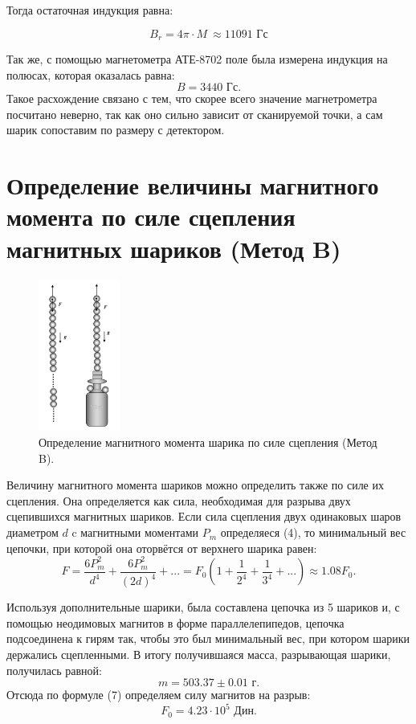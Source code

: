 \documentclass[a4paper, 14pt]{extarticle}%
\newcommand\ECaption[1]{%
     \captionsetup{font=footnotesize}%
     \caption{#1}}
\newcommand\ECaption[1]{%
     \captionsetup{font=footnotesize}%
     \caption{#1}}
\begin{document}
Тогда остаточная индукция равна:

\[B_r = 4\pi\cdot M\ \approx 11091 \text{  Гс} \]

Так же, с помощью магнетометра АТЕ-8702 поле была измерена индукция на полюсах, которая оказалась равна: 
\[B = 3440 \text{ Гс}.\]
Такое расхождение связано с тем, что скорее всего значение магнетрометра посчитано неверно, так как оно сильно зависит от сканируемой точки, а сам шарик сопоставим по размеру с детектором.

\section{Определение величины магнитного момента по силе
сцепления магнитных шариков (Метод B)}

\begin{figure}
\begin{center}
\includegraphics[height=5cm]{teor.png}
\end{center}
\ECaption{Определение магнитного момента шарика по силе
сцепления (Метод B).}
\end{figure}

Величину магнитного момента шариков можно
определить также по силе их сцепления. Она определяется как
сила, необходимая для разрыва двух сцепившихся магнитных
шариков. Если сила сцепления двух одинаковых шаров диаметром $d$ c магнитными моментами $P_m$ определяеся (4), то минимальный вес цепочки, при которой она оторвётся от верхнего шарика равен:
\begin{equation}
F = \frac{6P_m^2}{d^4} + \frac{6P_m^2}{(2d)^4} + ... = F_0\left(1+ \frac{1}{2^4}+\frac{1}{3^4}+...\right) \approx 1.08F_0.
\end{equation}

Используя дополнительные шарики, была составлена цепочка из 5 шариков и, с помощью
неодимовых магнитов в форме параллелепипедов, цепочка подсоединена к гирям так, чтобы это был минимальный вес, при котором шарики держались сцепленными. В итогу получившаяся масса, разрывающая шарики, получилась равной:
\[m = 503.37 \pm 0.01 \text{ г}.\]
Отсюда по формуле (7) определяем силу магнитов на разрыв:
\[F_0 = 4.23\cdot 10^5 \text{ Дин}. \]
\end{document}
